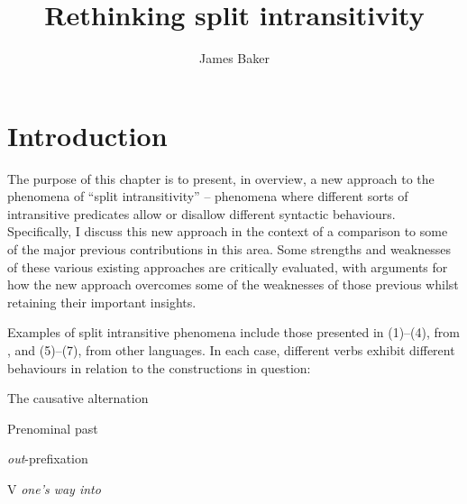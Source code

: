 \documentclass[output=paper]{langsci/langscibook}
\author{James Baker\affiliation{University of Cambridge}}
\title{Rethinking split intransitivity}
\begin{document}
\glsresetall

\section{Introduction}

The purpose of this chapter is to present, in overview, a new approach to the
phenomena of \enquote{split intransitivity} – phenomena where different sorts
of intransitive predicates allow or disallow different syntactic behaviours.
Specifically, I discuss this new approach in the context of a comparison to
some of the major previous contributions in this area. Some strengths and
weaknesses of these various existing approaches are critically evaluated, with
arguments for how the new approach overcomes some of the weaknesses of those
previous whilst retaining their important insights.

Examples of split intransitive phenomena include those presented in (1)--(4),
from , and (5)--(7), from other languages. In each case, different verbs
exhibit different behaviours in relation to the constructions in question:

\ea The causative alternation
    \ea
        \z
    \ex
        \z
    \ex
        \z
    \ex
        \z
    \z
\z

\ea Prenominal past 
    \z
\z

\ea \emph{out}-prefixation
    \z
\z

\ea V \emph{one's way into}
    \z
\z
\end{document}
